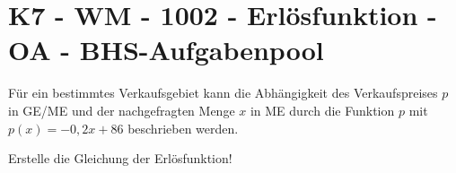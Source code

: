 \section{K7 - WM - 1002 - Erlösfunktion - OA - BHS-Aufgabenpool}

\begin{beispiel}[K7 - WM]{1}
Für ein bestimmtes Verkaufsgebiet kann die Abhängigkeit des Verkaufspreises $p$ in GE/ME und der nachgefragten Menge $x$ in ME durch die Funktion $p$ mit $p(x)=-0,2x+86$ beschrieben werden.
				
				Erstelle die Gleichung der Erlösfunktion!
				
\end{beispiel}